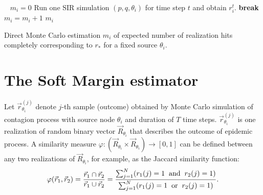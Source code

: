 \documentclass[times, utf8, diplomski]{fer}
\begin{document}
\vspace{5mm}
\begin{algorithm}[H]
\ 
 $m_i = 0$\; 
  {
    {
    Run one SIR simulation $(p, q, \theta_i)$ for time step $t$ and obtain  
    $r_i^t$.\; 
     {
   \textbf{break}\;
    }
   }
     {
  $m_i = m_i + 1$\;
 }
 }
  \Return $m_i$
 \label{DMC_lag}
 \caption{Direct Monte Carlo estimation $m_i$ of expected number of realization hits completely corresponding to $r_*$  for a fixed source $\theta_i$.}
\end{algorithm}
  \vspace{5mm}


\section{The Soft Margin estimator}

Let $\vec r^{(j)}_{\theta_i}$ denote $j$-th sample (outcome) obtained by Monte Carlo simulation of contagion process with source node $\theta_i$ and duration of $T$ time steps. $\vec r^{(j)}_{\theta_i}$ is one realization of random binary vector $\vec R_{\theta_i}$ that describes the outcome of epidemic process. A similarity measure $\varphi : (\vec R_{\theta_i} \times \vec R_{\theta_i}) \rightarrow [0, 1 ]$  can  be defined between any two  realizations of $\vec R_{\theta_i}$, for example,  as the Jaccard similarity function:
\begin{equation}
\varphi(\vec r_1, \vec r_2) = \frac{\vec r_1 \cap \vec r_2}{\vec r_1 \cup \vec r_2 } = \frac{\sum_{j = 1}^{N} (r_1(j) = 1 \hspace{2mm} \text{and} \hspace{2mm} r_2(j) = 1) }{\sum_{j = 1}^{N} (r_1(j) = 1 \hspace{2mm} \text{or} \hspace{2mm} r_2(j) = 1) }.
\label{JaccardPHI}
\end{equation}
\end{document}
